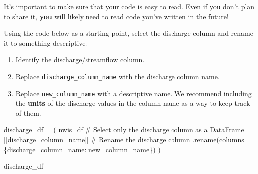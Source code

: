 \documentclass[
  letterpaper,
  DIV=11,
  numbers=noendperiod,
  oneside]{scrreprt}
\newenvironment{Shaded}{\begin{snugshade}}{\end{snugshade}}
\newcommand{\CommentTok}[1]{\textcolor[rgb]{0.37,0.37,0.37}{#1}}
\newcommand{\NormalTok}[1]{\textcolor[rgb]{0.00,0.23,0.31}{#1}}
\newcommand{\OperatorTok}[1]{\textcolor[rgb]{0.37,0.37,0.37}{#1}}
\newcommand{\StringTok}[1]{\textcolor[rgb]{0.13,0.47,0.30}{#1}}
\providecommand{\tightlist}{%
  \setlength{\itemsep}{0pt}\setlength{\parskip}{0pt}}
\begin{document}
It's important to make sure that your code is easy to read. Even if you
don't plan to share it, \textbf{you} will likely need to read code
you've written in the future!

\begin{tcolorbox}[enhanced jigsaw, colbacktitle=quarto-callout-color!10!white, opacityback=0, bottomtitle=1mm, toptitle=1mm, bottomrule=.15mm, left=2mm, colframe=quarto-callout-color-frame, leftrule=.75mm, opacitybacktitle=0.6, colback=white, rightrule=.15mm, toprule=.15mm, breakable, titlerule=0mm, title=\textcolor{quarto-callout-color}{\faInfo}\hspace{0.5em}{Try It}, coltitle=black, arc=.35mm]

Using the code below as a starting point, select the discharge column
and rename it to something descriptive:

\begin{enumerate}
\def\labelenumi{\arabic{enumi}.}
\tightlist
\item
  Identify the discharge/streamflow column.
\item
  Replace \texttt{discharge\_column\_name} with the discharge column
  name.
\item
  Replace \texttt{new\_column\_name} with a descriptive name. We
  recommend including the \textbf{units} of the discharge values in the
  column name as a way to keep track of them.
\end{enumerate}

\end{tcolorbox}

\begin{Shaded}
\begin{Highlighting}[]
\NormalTok{discharge\_df }\OperatorTok{=}\NormalTok{ (}
\NormalTok{    nwis\_df}
    \CommentTok{\# Select only the discharge column as a DataFrame}
\NormalTok{    [[}\StringTok{\textquotesingle{}discharge\_column\_name\textquotesingle{}}\NormalTok{]]}
    \CommentTok{\# Rename the discharge column}
\NormalTok{    .rename(columns}\OperatorTok{=}\NormalTok{\{}\StringTok{\textquotesingle{}discharge\_column\_name\textquotesingle{}}\NormalTok{: }\StringTok{\textquotesingle{}new\_column\_name\textquotesingle{}}\NormalTok{\})}
\NormalTok{)}

\NormalTok{discharge\_df}
\end{Highlighting}
\end{Shaded}
\end{document}
